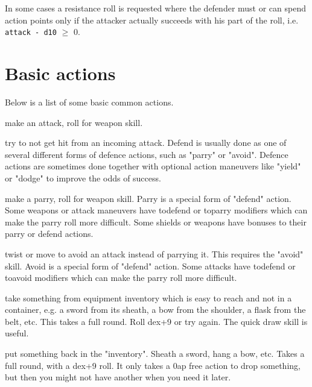 In some cases a resistance roll is requested where the defender must or can spend action points only if the attacker actually succeeds with his part of the roll, i.e. \verb|attack - d10| $\geq$ 0.
















\section*{Basic actions}


Below is a list of some basic common actions.

\openactionslist


 make an attack, roll for weapon skill.


 try to not get hit from an incoming attack. Defend is usually done as one of several different forms of defence actions, such as "parry" or "avoid". Defence actions are sometimes done together with optional action maneuvers like "yield" or "dodge" to improve the odds of success.


 make a parry, roll for weapon skill.
Parry is a special form of "defend" action. Some weapons or attack maneuvers have todefend or toparry modifiers which can make the parry roll more difficult. Some shields or weapons have bonuses to their parry or defend actions.


 twist or move to avoid an attack instead of parrying it. This requires the "avoid" skill. Avoid is a special form of "defend" action. Some attacks have todefend or toavoid modifiers which can make the parry roll more difficult.


 take something from equipment inventory which is easy to reach and not in a container, e.g. a sword from its sheath, a bow from the shoulder, a flask from the belt, etc. This takes a full round. Roll dex+9 or try again. The quick draw skill is useful.


 put something back in the "inventory". Sheath a sword, hang a bow, etc. Takes a full round, with a dex+9 roll. It only takes a 0ap free action to drop something, but then you might not have another when you need it later.


